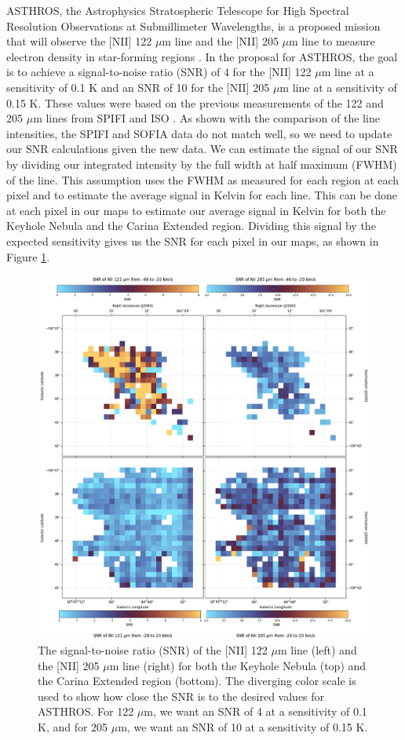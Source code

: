 ASTHROS, the Astrophysics Stratospheric Telescope for High Spectral Resolution Observations at Submillimeter Wavelengths, is a proposed mission that will observe the [NII] 122 $\mu$m line and the [NII] 205 $\mu$m line to measure electron density in star-forming regions \parencite{siles2020asthros}.
In the proposal for ASTHROS, the goal is to achieve a signal-to-noise ratio (SNR) of 4 for the [NII] 122 $\mu$m line at a sensitivity of 0.1 K and an SNR of 10 for the [NII] 205 $\mu$m line at a sensitivity of 0.15 K.
These values were based on the previous measurements of the 122 and 205 $\mu$m lines from SPIFI and ISO \parencite{oberst2011205}.
As shown with the comparison of the line intensities, the SPIFI and SOFIA data do not match well, so we need to update our SNR calculations given the new data.
We can estimate the signal of our SNR by dividing our integrated intensity by the full width at half maximum (FWHM) of the line.
This assumption uses the FWHM as measured for each region at each pixel and to estimate the average signal in Kelvin for each line. 
This can be done at each pixel in our maps to estimate our average signal in Kelvin for both the Keyhole Nebula and the Carina Extended region.
Dividing this signal by the expected sensitivity gives us the SNR for each pixel in our maps, as shown in Figure \ref{carina/fig:snr}.

\begin{figure}
    \centering
    \includegraphics[width=.9\textwidth]{figs/carina/snr.png}
    \caption[SNR of the {[}NII{]} 122 $\mu$m and 205 $\mu$m Lines in the Carina Nebula]{
        The signal-to-noise ratio (SNR) of the [NII] 122 $\mu$m line (left) and the [NII] 205 $\mu$m line (right) for both the Keyhole Nebula (top) and the Carina Extended region (bottom).
        The diverging color scale is used to show how close the SNR is to the desired values for ASTHROS.
        For 122 $\mu$m, we want an SNR of 4 at a sensitivity of 0.1 K, and for 205 $\mu$m, we want an SNR of 10 at a sensitivity of 0.15 K.
        }
    \label{carina/fig:snr}
\end{figure}

